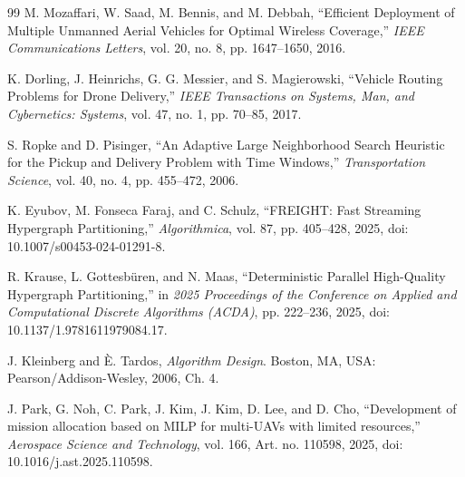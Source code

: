 \begin{thebibliography}{99}
	M. Mozaffari, W. Saad, M. Bennis, and M. Debbah,
	``Efficient Deployment of Multiple Unmanned Aerial Vehicles for Optimal Wireless Coverage,''
	\emph{IEEE Communications Letters},
	vol. 20, no. 8, pp. 1647--1650, 2016.
	
	K. Dorling, J. Heinrichs, G. G. Messier, and S. Magierowski,
	``Vehicle Routing Problems for Drone Delivery,''
	\emph{IEEE Transactions on Systems, Man, and Cybernetics: Systems},
	vol. 47, no. 1, pp. 70--85, 2017.
	
	S. Ropke and D. Pisinger,
	``An Adaptive Large Neighborhood Search Heuristic for the Pickup and Delivery Problem with Time Windows,''
	\emph{Transportation Science},
	vol. 40, no. 4, pp. 455--472, 2006.
	
	
	K. Eyubov, M. Fonseca Faraj, and C. Schulz,
	``FREIGHT: Fast Streaming Hypergraph Partitioning,''
	\emph{Algorithmica}, vol. 87, pp. 405--428, 2025,
	doi: 10.1007/s00453-024-01291-8.
	
	R. Krause, L. Gottesb\"uren, and N. Maas,
	``Deterministic Parallel High-Quality Hypergraph Partitioning,''
	in \emph{2025 Proceedings of the Conference on Applied and Computational Discrete Algorithms (ACDA)},
	pp. 222--236, 2025,
	doi: 10.1137/1.9781611979084.17.
	
	J. Kleinberg and \`E. Tardos,
	\emph{Algorithm Design}. Boston, MA, USA: Pearson/Addison-Wesley, 2006, Ch. 4.
	
	J. Park, G. Noh, C. Park, J. Kim, J. Kim, D. Lee, and D. Cho,
	``Development of mission allocation based on MILP for multi-UAVs with limited resources,''
	\emph{Aerospace Science and Technology}, vol. 166, Art. no. 110598, 2025,
	doi: 10.1016/j.ast.2025.110598.
	

\end{thebibliography}
